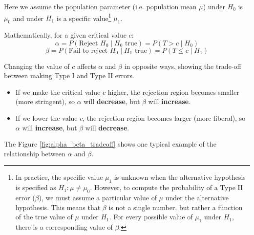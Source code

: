 \documentclass[twoside]{book}
\begin{document}
Here we assume the population parameter (i.e. population mean $\mu$) under $H_0$ is $\mu_0$ and under $H_1$ is a specific value\footnote{In practice, the specific value $\mu_1$ is unknown when the alternative hypothesis is specified as $H_1: \mu \neq \mu_0$. However, to compute the probability of a Type II error ($\beta$), we must assume a particular value of $\mu$ under the alternative hypothesis. This means that $\beta$ is not a single number, but rather a function of the true value of $\mu$ under $H_1$. For every possible value of $\mu_1$ under $H_1$, there is a corresponding value of $\beta$.} $\mu_1$.

Mathematically, for a given critical value \(c\):
\[
\alpha = P(\text{Reject } H_0 \mid H_0 \text{ true}) = P(T > c \mid H_0)
\]
\[
\beta = P(\text{Fail to reject } H_0 \mid H_1 \text{ true}) = P(T \le c \mid H_1)
\]

Changing the value of \(c\) affects \(\alpha\) and \(\beta\) in opposite ways, showing the trade-off between making Type I and Type II errors.


\begin{itemize}
	\item If we make the critical value \( c \) higher, the rejection region becomes smaller (more stringent), so \( \alpha \) will \textbf{decrease}, but \( \beta \) will \textbf{increase}.
	\item If we lower the value \( c \), the rejection region becomes larger (more liberal), so \( \alpha \) will \textbf{increase}, but \( \beta \) will \textbf{decrease}.
\end{itemize}

The Figure \ref{fig:alpha_beta_tradeoff} shows one typical example of the relationship between $\alpha$ and $\beta$.
\end{document}
